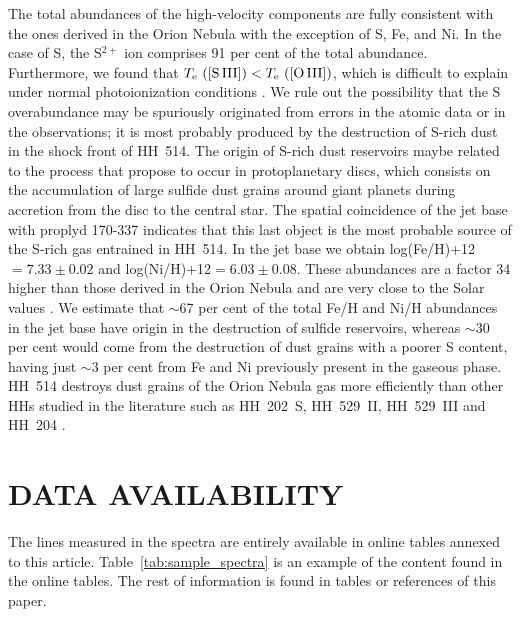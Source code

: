 \documentclass[fleqn,usenatbib]{mnras}
\newcommand{\jorge}[1]{{\color{magenta}J: #1}}
\begin{document}
The total abundances of the high-velocity components are fully consistent with the ones derived in the Orion Nebula with the exception of S, Fe, and Ni. In the case of S, the S$^{2+}$ ion comprises 91 per cent of the total abundance. Furthermore, we found that $T_{\rm e} \text{ ([S\thinspace III])} < T_{\rm e} \text{ ([O\thinspace III])} $, which is difficult to explain under normal photoionization conditions \citep[][]{Binette2012}. We rule out the possibility that the S overabundance may be spuriously originated from errors in the atomic data or in the observations;  it is most probably produced by the destruction of S-rich dust in the shock front of HH~514. The origin of  S-rich dust reservoirs maybe related to the process that \citet{Kama19} propose to occur in protoplanetary discs, which consists on the accumulation of large sulfide dust grains around giant planets during  accretion from the disc to the central star. The spatial coincidence of the jet base with proplyd 170-337 indicates that this last object is the most probable source of the S-rich gas entrained in HH~514. In the jet base we obtain log(Fe/H)+12$ =  7.33 \pm 0.02$ and log(Ni/H)+12$ = 6.03 \pm 0.08$. These abundances are a factor 34 higher than those derived in the Orion Nebula and are very close to the Solar values \citep[][]{lodders19}. We estimate that $\sim$67 per cent of the total Fe/H and Ni/H abundances in the jet base have origin in the destruction of sulfide reservoirs, whereas $\sim$30 per cent would come from the destruction of dust grains with a poorer S content, having just $\sim$3 per cent from Fe and Ni previously present in the gaseous phase. HH~514 destroys dust grains of the Orion Nebula gas more efficiently than other HHs studied in the literature such as HH~202~S, HH~529~II, HH~529~III and HH~204 \citep[][]{mesadelgado09, mendez2021, mendez2021-2}. %




\section*{DATA AVAILABILITY}
The lines measured in the spectra are entirely available in online tables annexed to this article. Table~\ref{tab:sample_spectra} is an example of the content found in the online tables. The rest of information is found in tables or references of this paper.
\end{document}
